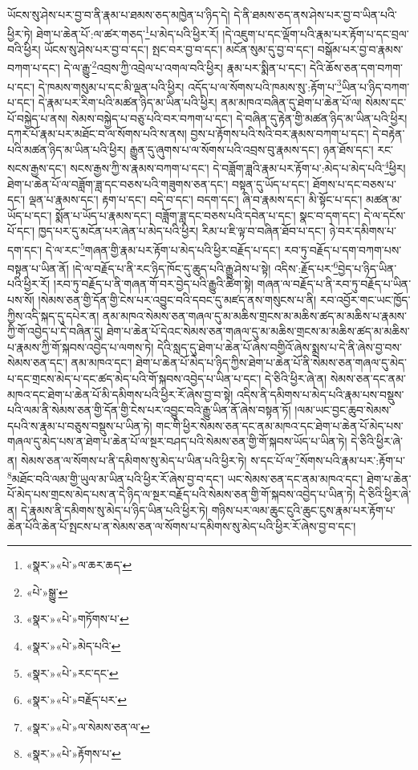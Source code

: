ཡོངས་སུ་ཤེས་པར་བྱ་བ་ནི་རྣམ་པ་ཐམས་ཅད་མཁྱེན་པ་ཉིད་དེ། དེ་ནི་ཐམས་ཅད་ནས་ཤེས་པར་བྱ་བ་ཡིན་པའི་ཕྱིར་ཏེ། ཐེག་པ་ཆེན་པོ་:ལ་ཚར་གཅད་\footnote{«སྣར་»«པེ་»ལ་ཆར་ཆད་}པ་མེད་པའི་ཕྱིར་རོ། །དེ་འཇུག་པ་དང་ལྡོག་པའི་རྣམ་པར་རྟོག་པ་དང་བྲལ་བའི་ཕྱིར། ཡོངས་སུ་ཤེས་པར་བྱ་བ་དང་། སྤང་བར་བྱ་བ་དང་། མངོན་སུམ་དུ་བྱ་བ་དང་། བསྒོམ་པར་བྱ་བ་རྣམས་བཀག་པ་དང་། དེ་ལ་རྒྱུ་\footnote{«པེ་»སྒྱུ་}འབྲས་ཀྱི་འབྲེལ་པ་འགལ་བའི་ཕྱིར། རྣམ་པར་སྨིན་པ་དང་། དེའི་ཆོས་ཅན་དག་བཀག་པ་དང་། དེ་ཁམས་གསུམ་པ་དང་མི་ལྡན་པའི་ཕྱིར། འདོད་པ་ལ་སོགས་པའི་ཁམས་སུ་:རྟོག་པ་\footnote{«སྣར་»«པེ་»གཏོགས་པ་}ཡིན་པ་ཉིད་བཀག་པ་དང་། དེ་རྣམ་པར་རིག་པའི་མཚན་ཉིད་མ་ཡིན་པའི་ཕྱིར། ནམ་མཁའ་བཞིན་དུ་ཐེག་པ་ཆེན་པོ་ལ། སེམས་དང་པོ་བསྐྱེད་པ་ནས། སེམས་བསྐྱེད་པ་བཅུ་པའི་བར་བཀག་པ་དང་། དེ་བཞིན་དུ་རྟེན་གྱི་མཚན་ཉིད་མ་ཡིན་པའི་ཕྱིར། དཀར་པོ་རྣམ་པར་མཐོང་བ་ལ་སོགས་པའི་ས་ནས། བྱས་པ་རྟོགས་པའི་སའི་བར་རྣམས་བཀག་པ་དང་། དེ་བརྟེན་པའི་མཚན་ཉིད་མ་ཡིན་པའི་ཕྱིར། རྒྱུན་དུ་ཞུགས་པ་ལ་སོགས་པའི་འབྲས་བུ་རྣམས་དང་། ཉན་ཐོས་དང་། རང་སངས་རྒྱས་དང་། སངས་རྒྱས་ཀྱི་ས་རྣམས་བཀག་པ་དང་། དེ་བཟློག་ཟླའི་རྣམ་པར་རྟོག་པ་:མེད་པ་མེད་པའི་\footnote{«སྣར་»«པེ་»མེད་པའི་}ཕྱིར། ཐེག་པ་ཆེན་པོ་ལ་བཟློག་ཟླ་དང་བཅས་པའི་གཟུགས་ཅན་དང་། བསྟན་དུ་ཡོད་པ་དང་། ཐོགས་པ་དང་བཅས་པ་དང་། ལྡན་པ་རྣམས་དང་། རྟག་པ་དང་། བདེ་བ་དང་། བདག་དང་། ཞི་བ་རྣམས་དང་། མི་སྟོང་པ་དང་། མཚན་མ་ཡོད་པ་དང་། སྨོན་པ་ཡོད་པ་རྣམས་དང་། བཟློག་ཟླ་དང་བཅས་པའི་དབེན་པ་དང་། སྣང་བ་དག་དང་། དེ་ལ་དངོས་པོ་དང་། ཁྱད་པར་དུ་མངོན་པར་ཞེན་པ་མེད་པའི་ཕྱིར། རིམ་པ་ཇི་ལྟ་བ་བཞིན་ཐོབ་པ་དང་། ཉེ་བར་དམིགས་པ་དག་དང་། དེ་ལ་རང་\footnote{«སྣར་»«པེ་»རང་དང་}གཞན་གྱི་རྣམ་པར་རྟོག་པ་མེད་པའི་ཕྱིར་བརྗོད་པ་དང་། རབ་ཏུ་བརྗོད་པ་དག་བཀག་པས་བསྟན་པ་ཡིན་ནོ། །དེ་ལ་བརྗོད་པ་ནི་རང་ཉིད་ཁོང་དུ་ཆུད་པའི་རྒྱུ་ཤེས་པ་སྟེ། འདིས་:རྗོད་པར་\footnote{«སྣར་»«པེ་»བརྗོད་པར་}བྱེད་པ་ཉིད་ཡིན་པའི་ཕྱིར་རོ། །རབ་ཏུ་བརྗོད་པ་ནི་གཞན་གོ་བར་བྱེད་པའི་རྒྱུའི་ཚིག་སྟེ། གཞན་ལ་བརྗོད་པ་ནི་རབ་ཏུ་བརྗོད་པ་ཡིན་པས་སོ། །སེམས་ཅན་གྱི་དོན་གྱི་ངེས་པར་འབྱུང་བའི་དབང་དུ་མཛད་ནས་གསུངས་པ་ནི། རབ་འབྱོར་གང་ཡང་ཁྱོད་ཀྱིས་འདི་སྐད་དུ་དཔེར་ན། ནམ་མཁའ་སེམས་ཅན་གཞལ་དུ་མ་མཆིས་གྲངས་མ་མཆིས་ཚད་མ་མཆིས་པ་རྣམས་ཀྱི་གོ་འབྱེད་པ་དེ་བཞིན་དུ། ཐེག་པ་ཆེན་པོ་དེའང་སེམས་ཅན་གཞལ་དུ་མ་མཆིས་གྲངས་མ་མཆིས་ཚད་མ་མཆིས་པ་རྣམས་ཀྱི་གོ་སྐབས་འབྱེད་པ་ལགས་ཏེ། དེའི་སླད་དུ་ཐེག་པ་ཆེན་པོ་ཞེས་བགྱིའོ་ཞེས་སྨྲས་པ་དེ་ནི་ཞེས་བྱ་བས་སེམས་ཅན་དང་། ནམ་མཁའ་དང་། ཐེག་པ་ཆེན་པོ་མེད་པ་ཉིད་ཀྱིས་ཐེག་པ་ཆེན་པོ་ནི་སེམས་ཅན་གཞལ་དུ་མེད་པ་དང་གྲངས་མེད་པ་དང་ཚད་མེད་པའི་གོ་སྐབས་འབྱེད་པ་ཡིན་པ་དང་། དེ་ཅིའི་ཕྱིར་ཞེ་ན། སེམས་ཅན་དང་ནམ་མཁའ་དང་ཐེག་པ་ཆེན་པོ་མི་དམིགས་པའི་ཕྱིར་རོ་ཞེས་བྱ་བ་སྟེ། འདིས་ནི་དམིགས་པ་མེད་པའི་རྣམ་པས་བསྡུས་པའི་ལམ་ནི་སེམས་ཅན་གྱི་དོན་གྱི་ངེས་པར་འབྱུང་བའི་རྒྱུ་ཡིན་ནོ་ཞེས་བསྟན་ཏོ། །ལམ་ཡང་བྱང་ཆུབ་སེམས་དཔའི་ས་རྣམ་པ་བཅུས་བསྡུས་པ་ཡིན་ཏེ། གང་གི་ཕྱིར་སེམས་ཅན་དང་ནམ་མཁའ་དང་ཐེག་པ་ཆེན་པོ་མེད་པས་གཞལ་དུ་མེད་པས་ན་ཐེག་པ་ཆེན་པོ་ལ་སྔར་བཤད་པའི་སེམས་ཅན་གྱི་གོ་སྐབས་ཡོད་པ་ཡིན་ཏེ། དེ་ཅིའི་ཕྱིར་ཞེ་ན། སེམས་ཅན་ལ་སོགས་པ་ནི་དམིགས་སུ་མེད་པ་ཡིན་པའི་ཕྱིར་ཏེ། ས་དང་པོ་ལ་\footnote{«སྣར་»«པེ་»ལ་སེམས་ཅན་ལ་}སོགས་པའི་རྣམ་པར་:རྟོག་པ་\footnote{«སྣར་»«པེ་»རྟོགས་པ་}མཐོང་བའི་ལམ་གྱི་ཡུལ་མ་ཡིན་པའི་ཕྱིར་རོ་ཞེས་བྱ་བ་དང་། ཡང་སེམས་ཅན་དང་ནམ་མཁའ་དང་། ཐེག་པ་ཆེན་པོ་མེད་པས་གྲངས་མེད་པས་ན་དེ་ཉིད་ལ་སྔར་བརྗོད་པའི་སེམས་ཅན་གྱི་གོ་སྐབས་འབྱེད་པ་ཡིན་ཏེ། དེ་ཅིའི་ཕྱིར་ཞེ་ན། དེ་རྣམས་ནི་དམིགས་སུ་མེད་པ་ཉིད་ཡིན་པའི་ཕྱིར་ཏེ། གཉིས་པར་ལམ་ཆུང་ངུའི་ཆུང་ངུས་རྣམ་པར་རྟོག་པ་ཆེན་པོའི་ཆེན་པོ་སྤངས་པ་ན་སེམས་ཅན་ལ་སོགས་པ་དམིགས་སུ་མེད་པའི་ཕྱིར་རོ་ཞེས་བྱ་བ་དང་། 
